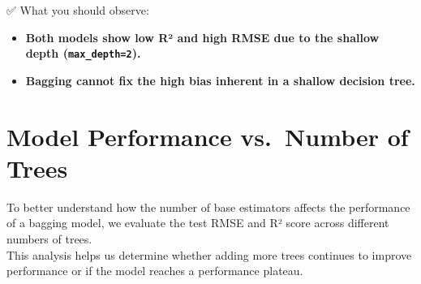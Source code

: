 \documentclass[
  letterpaper,
  DIV=11,
  numbers=noendperiod]{scrreprt}
\providecommand{\tightlist}{%
  \setlength{\itemsep}{0pt}\setlength{\parskip}{0pt}}\usepackage{longtable,booktabs,array}
\begin{document}
✅ What you should observe:

\begin{itemize}
\tightlist
\item
  \textbf{Both models show low R² and high RMSE due to the shallow depth
  (\texttt{max\_depth=2}).}
\item
  \textbf{Bagging cannot fix the high bias inherent in a shallow
  decision tree.}
\end{itemize}

\section{Model Performance vs.~Number of
Trees}\label{model-performance-vs.-number-of-trees}

To better understand how the number of base estimators affects the
performance of a bagging model, we evaluate the test RMSE and R² score
across different numbers of trees.\\
This analysis helps us determine whether adding more trees continues to
improve performance or if the model reaches a performance plateau.
\end{document}
